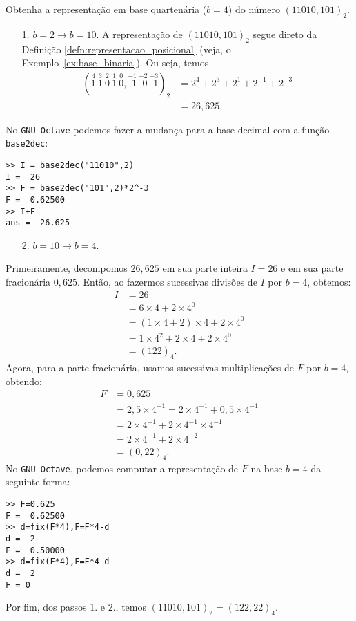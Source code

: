 \begin{ex}
  Obtenha a representação em base quartenária ($b=4$) do número $(11010,101)_2$.
  \begin{itemize}
  \item[1.] $b=2 \to b=10$. 
A representação de $(11010,101)_2$ segue direto da Definição \ref{defn:representacao_posicional} (veja, o Exemplo~\ref{ex:base_binaria}). Ou seja, temos
\begin{align}
    (\stackrel{4}{1}~\stackrel{3}{1}~\stackrel{2}{0}~\stackrel{1}{1}~\stackrel{0}{0},\stackrel{-1}{~\,1}~\stackrel{-2}{~\,0}~\stackrel{-3}{~\,1})_2 &= 2^4 + 2^3 + 2^1 + 2^{-1} + 2^{-3} \\
  &= 26,625.
\end{align}
  \end{itemize}
\ifisoctave
No \verb+GNU Octave+ podemos fazer a mudança para a base decimal com a função \verb+base2dec+:
\begin{verbatim}
>> I = base2dec("11010",2)
I =  26
>> F = base2dec("101",2)*2^-3
F =  0.62500
>> I+F
ans =  26.625
\end{verbatim}
\fi

\begin{itemize}
\item[2.] $b=10 \to b=4$.
\end{itemize}
Primeiramente, decompomos $26,625$ em sua parte inteira $I = 26$ e em sua parte fracionária $0,625$. Então, ao fazermos sucessivas divisões de $I$ por $b=4$, obtemos:
\begin{align}
  I &= 26\\
  &= 6\times 4 + 2\times 4^0\\
  &= (1\times 4 + 2)\times 4 + 2\times 4^0\\
  &= 1\times 4^2 + 2\times 4 + 2\times 4^0\\
  &= (122)_4.
\end{align}
Agora, para a parte fracionária, usamos sucessivas multiplicações de $F$ por $b=4$, obtendo:
\begin{align}
  F &= 0,625\\
  &= 2,5\times 4^{-1} = 2\times 4^{-1} + 0,5\times 4^{-1}\\
  &= 2\times 4^{-1} + 2\times 4^{-1}\times 4^{-1}\\
  &= 2\times 4^{-1} + 2\times 4^{-2}\\
  &= (0,22)_{4}.
\end{align}
No \verb+GNU Octave+, podemos computar a representação de $F$ na base $b=4$ da seguinte forma:
\begin{verbatim}
>> F=0.625
F =  0.62500
>> d=fix(F*4),F=F*4-d
d =  2
F =  0.50000
>> d=fix(F*4),F=F*4-d
d =  2
F = 0
\end{verbatim}

Por fim, dos passos 1. e 2., temos $(11010,101)_2 = (122,22)_4$.
\end{ex}

